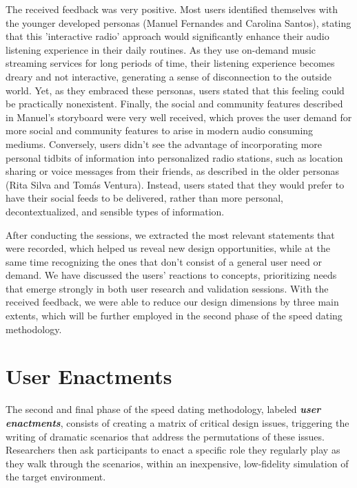 {The received feedback was very positive. Most users identified themselves with the younger developed personas (Manuel Fernandes and Carolina Santos), stating that this 'interactive radio' approach would significantly enhance their audio listening experience in their daily routines. As they use on-demand music streaming services for long periods of time, their listening experience becomes dreary and not interactive, generating a sense of disconnection to the outside world. Yet, as they embraced these personas, users stated that this feeling could be practically nonexistent. Finally, the social and community features described in Manuel's storyboard were very well received, which proves the user demand for more social and community features to arise in modern audio consuming mediums. Conversely, users didn't see the advantage of incorporating more personal tidbits of information into personalized radio stations, such as location sharing or voice messages from their friends, as described in the older personas (Rita Silva and Tomás Ventura). Instead, users stated that they would prefer to have their social feeds to be delivered, rather than more personal, decontextualized, and sensible types of information.

After conducting the sessions, we extracted the most relevant statements that were recorded, which helped us reveal new design opportunities, while at the same time recognizing the ones that don't consist of a general user need or demand. We have discussed the users' reactions to concepts, prioritizing needs that emerge strongly in both user research and validation sessions. With the received feedback, we were able to reduce our design dimensions by three main extents, which will be further employed in the second phase of the speed dating methodology.

\section{User Enactments}
\label{sec:userenactments}

The second and final phase of the speed dating methodology, labeled \textbf{\textit{user enactments}}, consists of creating a matrix of critical design issues, triggering the writing of dramatic scenarios that address the permutations of these issues. Researchers then ask participants to enact a specific role they regularly play as they walk through the scenarios, within an inexpensive, low-fidelity simulation of the target environment. ~\cite{Davidoff2007}

}
